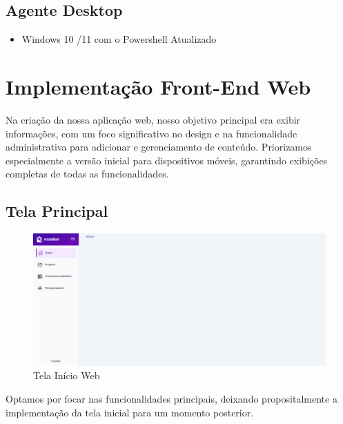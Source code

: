 \subsection{Agente Desktop}
\begin{itemize}
\item Windows 10 /11 com o Powershell Atualizado
\end{itemize}


\section{Implementação Front-End Web}
Na criação da nossa aplicação web, nosso objetivo principal era exibir informações, com um foco significativo no design e na funcionalidade administrativa para adicionar e gerenciamento de conteúdo. Priorizamos especialmente a versão inicial para dispositivos móveis, garantindo exibições completas de todas as funcionalidades.



\subsection{Tela Principal}

\begin{figure}[H]
    \centering
    \includegraphics[width=1\linewidth]{figuras/SiteTelaPrincipal.png}
    \caption{Tela Início Web}
    \label{fig:enter-label}
\end{figure}
Optamos por focar nas funcionalidades principais, deixando propositalmente a implementação da tela inicial para um momento posterior.

